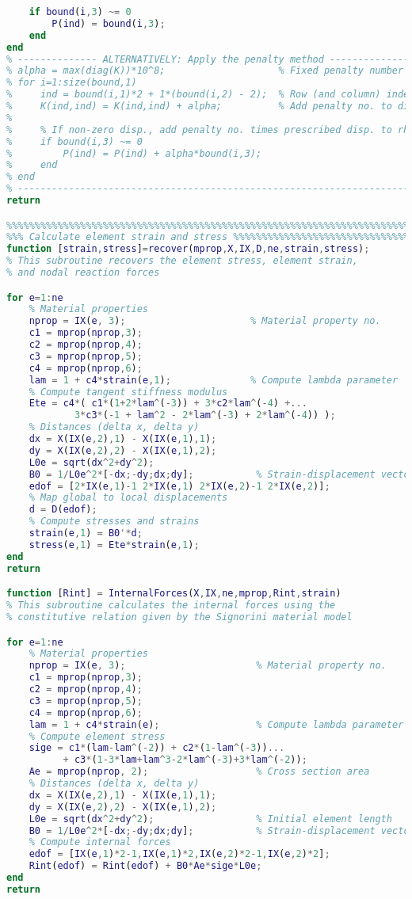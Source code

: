 \begin{lstlisting}[language=Matlab, caption = FE implementation for material non-linearity, label=lst:CodeMNA]
    % Set load vector equal to prescribed non-zero displacements
    if bound(i,3) ~= 0
        P(ind) = bound(i,3);
    end
end
% -------------- ALTERNATIVELY: Apply the penalty method ------------------
% alpha = max(diag(K))*10^8;                    % Fixed penalty number
% for i=1:size(bound,1)
%     ind = bound(i,1)*2 + 1*(bound(i,2) - 2);  % Row (and column) index
%     K(ind,ind) = K(ind,ind) + alpha;          % Add penalty no. to diag(K)
%    
%     % If non-zero disp., add penalty no. times prescribed disp. to rhs
%     if bound(i,3) ~= 0  
%         P(ind) = P(ind) + alpha*bound(i,3);     
%     end
% end
% -------------------------------------------------------------------------
return

%%%%%%%%%%%%%%%%%%%%%%%%%%%%%%%%%%%%%%%%%%%%%%%%%%%%%%%%%%%%%%%%%%%%%%%%%%%
%%% Calculate element strain and stress %%%%%%%%%%%%%%%%%%%%%%%%%%%%%%%%%%%
function [strain,stress]=recover(mprop,X,IX,D,ne,strain,stress);
% This subroutine recovers the element stress, element strain, 
% and nodal reaction forces      

for e=1:ne
    % Material properties
    nprop = IX(e, 3);                      % Material property no.
    c1 = mprop(nprop,3);
    c2 = mprop(nprop,4);
    c3 = mprop(nprop,5);
    c4 = mprop(nprop,6);
    lam = 1 + c4*strain(e,1);              % Compute lambda parameter
    % Compute tangent stiffness modulus
    Ete = c4*( c1*(1+2*lam^(-3)) + 3*c2*lam^(-4) +...
            3*c3*(-1 + lam^2 - 2*lam^(-3) + 2*lam^(-4)) );
    % Distances (delta x, delta y)
    dx = X(IX(e,2),1) - X(IX(e,1),1);
    dy = X(IX(e,2),2) - X(IX(e,1),2);
    L0e = sqrt(dx^2+dy^2);
    B0 = 1/L0e^2*[-dx;-dy;dx;dy];           % Strain-displacement vector
    edof = [2*IX(e,1)-1 2*IX(e,1) 2*IX(e,2)-1 2*IX(e,2)];
    % Map global to local displacements
    d = D(edof);
    % Compute stresses and strains
    strain(e,1) = B0'*d;
    stress(e,1) = Ete*strain(e,1);
end
return

function [Rint] = InternalForces(X,IX,ne,mprop,Rint,strain)
% This subroutine calculates the internal forces using the
% constitutive relation given by the Signorini material model

for e=1:ne
    % Material properties
    nprop = IX(e, 3);                       % Material property no.
    c1 = mprop(nprop,3);
    c2 = mprop(nprop,4);
    c3 = mprop(nprop,5);
    c4 = mprop(nprop,6);
    lam = 1 + c4*strain(e);                 % Compute lambda parameter
    % Compute element stress
    sige = c1*(lam-lam^(-2)) + c2*(1-lam^(-3))...
          + c3*(1-3*lam+lam^3-2*lam^(-3)+3*lam^(-2)); 
    Ae = mprop(nprop, 2);                   % Cross section area
    % Distances (delta x, delta y)
    dx = X(IX(e,2),1) - X(IX(e,1),1);
    dy = X(IX(e,2),2) - X(IX(e,1),2);                 
    L0e = sqrt(dx^2+dy^2);                  % Initial element length
    B0 = 1/L0e^2*[-dx;-dy;dx;dy];           % Strain-displacement vector
    % Compute internal forces
    edof = [IX(e,1)*2-1,IX(e,1)*2,IX(e,2)*2-1,IX(e,2)*2];
    Rint(edof) = Rint(edof) + B0*Ae*sige*L0e;
end
return


\end{lstlisting}
